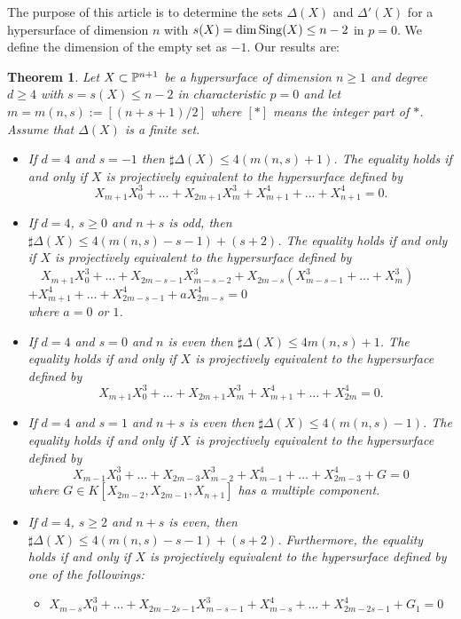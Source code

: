 \documentclass[10pt,oneside]{amsart}
\newtheorem{theorem}{Theorem}
\theoremstyle{definition}
\begin{document}
The purpose of this article is to determine the sets $\Delta(X)$ and $\Delta'(X)$ for a hypersurface of dimension $n$ with $s(X)=\dim {\rm Sing}(X) \le n-2$ in $p=0$. 
We define the dimension of the empty set as $-1$.  
Our results are: 

\begin{theorem} \label{InnerGalois}
Let $X \subset \Bbb P^{n+1}$ be a hypersurface of dimension $n \ge 1$ and degree $d \ge 4$ with $s=s(X) \le n-2$ in characteristic $p=0$ and let $m=m(n,s):= [(n+s+1)/2]$ where $[*]$ means the integer part of $*$. 
Assume that $\Delta(X)$ is a finite set. 
\begin{itemize}
\item[(I-0)] If $d=4$ and $s=-1$ then $\sharp\Delta(X) \le 4(m(n,s)+1)$. 
The equality holds if and only if $X$ is projectively equivalent to the hypersurface defined by 
$$ X_{m+1}X_0^3+\dots+X_{2m+1}X_{m}^3+X_{m+1}^4+\dots+X_{n+1}^4=0.$$ 
\item[(I-1)] If $d=4$, $s \ge 0$ and $n+s$ is odd, then $\sharp\Delta(X) \le 4(m(n,s)-s-1)+(s+2)$. 
The equality holds if and only if $X$ is projectively equivalent to the hypersurface defined by \\
\ \ $X_{m+1}X_0^3+\dots+X_{2m-s-1}X_{m-s-2}^3+X_{2m-s}(X_{m-s-1}^3+\dots+X_{m}^3)$ \\
\hspace{70mm} $+X_{m+1}^4+\dots+X_{2m-s-1}^4+aX_{2m-s}^4=0 $ \\
where $a=0$ or $1$. 
\item[(I-2)] If $d=4$ and $s=0$ and $n$ is even then $\sharp\Delta(X) \le 4m(n,s)+1$. 
The equality holds if and only if $X$ is projectively equivalent to the hypersurface defined by 
$$ X_{m+1}X_0^3+\dots+X_{2m+1}X_{m}^3+X_{m+1}^4+\dots+X_{2m}^4=0. $$
\item[(I-3)] If $d=4$ and $s=1$ and $n+s$ is even then $\sharp\Delta(X) \le 4(m(n,s)-1)$. 
The equality holds if and only if $X$ is projectively equivalent to the hypersurface defined by 
$$ X_{m-1}X_0^3+\dots+X_{2m-3}X_{m-2}^3+X_{m-1}^4+\dots+X_{2m-3}^4+G=0 $$
where $G \in K[X_{2m-2}, X_{2m-1}, X_{n+1}]$ has a multiple component. 
\item[(I-4)] If $d=4$, $s \ge 2$ and $n+s$ is even, then $\sharp\Delta(X) \le 4(m(n,s)-s-1)+(s+2)$. 
Furthermore, the equality holds if and only if $X$ is projectively equivalent to the hypersurface defined by one of the followings: 
\begin{itemize}
\item[(i)] $X_{m-s}X_0^3+\dots+X_{2m-2s-1}X_{m-s-1}^3+X_{m-s}^4+\dots+X_{2m-2s-1}^4+G_1=0$ \\ 

\end{itemize}
\end{itemize}
\end{theorem}
\end{document}
